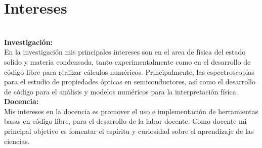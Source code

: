 \documentclass[letterpaper]{twentysecondcv} %
\begin{document}
\section{Intereses}\\
\textbf{Investigaci\'on:}\\
En la investigación mis principales intereses son en el area de física del estado solido y materia condensada, tanto experimentalmente como en el desarrollo de código libre para realizar cálculos numéricos. Principalmente, las espectroscopias para el estudio de propiedades ópticas en semiconductores, así como el desarrollo de código para el análisis y modelos numéricos para la interpretación  física. \\

\textbf{Docencia:}\\
Mis intereses en la docencia es promover el uso e implementación de herramientas basas en código libre, para el desarrollo de la labor docente. Como docente mi principal objetivo es fomentar el espíritu y curiosidad sobre el aprendizaje de las ciencias. 
\end{document}
